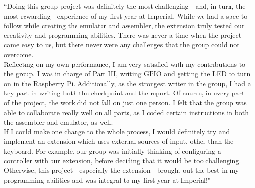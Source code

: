 \documentclass[11pt]{article}
\newenvironment{myquote}%
  {\list{}{\leftmargin=0.0in\rightmargin=0.0in}\item[]}%
  {\endlist}
\begin{document}
\begin{myquote}
``Doing this group project was definitely the most challenging - and, in turn, the most rewarding - experience of my first year at Imperial. While we had a spec to follow while creating the emulator and assembler, the extension truly tested our creativity and programming abilities. There was never a time when the project came easy to us, but there never were any challenges that the group could not overcome.
\\Reflecting on my own performance, I am very satisfied with my contributions to the group. I was in charge of Part III, writing GPIO and getting the LED to turn on in the Raspberry Pi. Additionally, as the strongest writer in the group, I had a key part in writing both the checkpoint and the report. Of course, in every part of the project, the work did not fall on just one person. I felt that the group was able to collaborate really well on all parts, as I coded certain instructions in both the assembler and emulator, as well.
\\If I could make one change to the whole process, I would definitely try and implement an extension which uses external sources of input, other than the keyboard. For example, our group was initially thinking of configuring a controller with our extension, before deciding that it would be too challenging. Otherwise, this project - especially the extension - brought out the best in my programming abilities and was integral to my first year at Imperial!"
\end{myquote}
\end{document}
